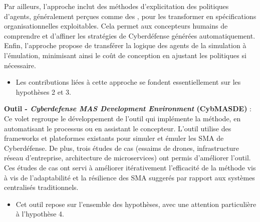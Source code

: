 Par ailleurs, l'approche inclut des méthodes d'explicitation des politiques d'agents, généralement perçues comme des , pour les transformer en spécifications organisationnelles exploitables. Cela permet aux concepteurs humains de comprendre et d'affiner les stratégies de Cyberdéfense générées automatiquement. Enfin, l'approche propose de transférer la logique des agents de la simulation à l'émulation, minimisant ainsi le coût de conception en ajustant les politiques si nécessaire.
\begin{itemize}
    \item Les contributions liées à cette approche se fondent essentiellement sur les hypothèses 2 et 3.
\end{itemize}

\textbf{Outil - \textit{Cyberdefense MAS Development Environment} (CybMASDE)} : Ce volet regroupe le développement de l'outil qui implémente la méthode, en automatisant le processus ou en assistant le concepteur. L'outil utilise des frameworks et plateformes existants pour simuler et émuler les SMA de Cyberdéfense. De plus, trois études de cas (essaims de drones, infrastructure réseau d'entreprise, architecture de microservices) ont permis d'améliorer l'outil. Ces études de cas ont servi à améliorer itérativement l'efficacité de la méthode vis à vis de l'adaptabilité et la résilience des SMA suggerés par rapport aux systèmes centralisés traditionnels.
\begin{itemize}
    \item Cet outil repose sur l'ensemble des hypothèses, avec une attention particulière à l'hypothèse 4.
\end{itemize}
